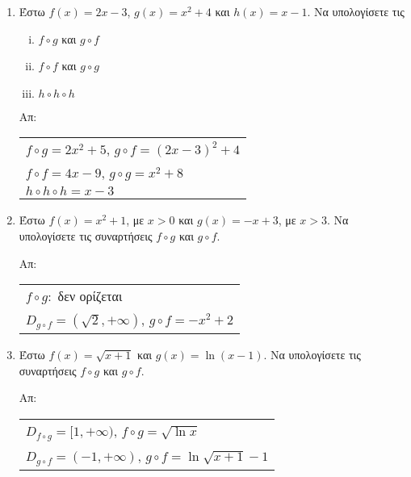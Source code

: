 



\everymath{\displaystyle}

\thispagestyle{empty}




\begin{center}
\end{center}

\vspace{\baselineskip}


\begin{enumerate}
    \item Έστω $ f(x) = 2x-3 $, $ g(x) = x^{2}+4 $ και $ h(x) = x-1 $. 
        Να υπολογίσετε τις 
        \begin{enumerate}[i)]
            \item $ f \circ g $ και $ g \circ f $
            \item $ f \circ f $ και $ g \circ g $
            \item $ h \circ h \circ h $
        \end{enumerate}

        \hfill Απ:  \begin{tabular}{l}
            $ f \circ g = 2x^{2}+5 $, $ g \circ f = (2x-3)^{2}+4 $ \\
            $ f \circ f = 4x-9 $, $ g \circ g = x^{2}+8 $ \\
            $ h \circ h \circ h = x-3 $
        \end{tabular}

    \item Έστω $ f(x) = x^{2}+1 $, με $ x>0 $ και $ g(x) = -x+3 $, με $ x>3 $. 
        Να υπολογίσετε τις συναρτήσεις $ f \circ g $ και $ g \circ f $.

        \hfill Απ: \begin{tabular}{l}
            $ f \circ g : $ δεν ορίζεται \\
            $ D_{g \circ f}=(\sqrt{2}, +\infty) $, $ g \circ f = -x^{2}+2 $
        \end{tabular}

    \item Έστω $ f(x) = \sqrt{x+1} $ και $ g(x) = \ln{(x-1)} $. Να υπολογίσετε 
        τις συναρτήσεις $ f \circ g $ και $ g \circ f $.

        \hfill Απ:  \begin{tabular}{l}
            $ D_{f \circ g}=[1,+\infty) $, $ f \circ g = \sqrt{\ln{x}} $ \\
            $ D_{g \circ f}=(-1,+\infty) $, $ g \circ f = \ln{\sqrt{x+1}} -1$
        \end{tabular}


\end{enumerate}
